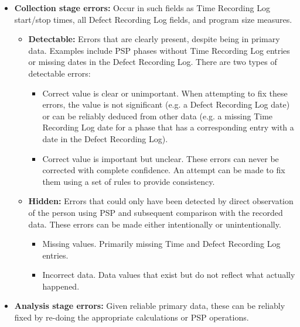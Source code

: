 \begin{itemize}
\item {\bf Collection stage errors:} Occur in such fields as Time Recording
  Log start/stop times, all Defect Recording Log fields, and program size
  measures.
   \begin{itemize}
   \item {\bf Detectable:} Errors that are clearly present, despite being
     in primary data.  Examples include PSP phases without Time Recording
     Log entries or missing dates in the Defect Recording Log.  There are
     two types of detectable errors:
      \begin{itemize}
      \item Correct value is clear or unimportant.  When attempting to fix
        these errors, the value is not significant (e.g. a Defect Recording
        Log date) or can be reliably deduced from other data (e.g. a
        missing Time Recording Log date for a phase that has a
        corresponding entry with a date in the Defect Recording Log).
      \item Correct value is important but unclear.  These errors can never be corrected
        with complete confidence.  An attempt can be made to fix them using
        a set of rules to provide consistency.
      \end{itemize}
    \item{\bf Hidden:} Errors that could only have been detected by direct
      observation of the person using PSP and subsequent comparison with
      the recorded data. These errors can be made either intentionally or
      unintentionally.
      \begin{itemize}
      \item Missing values.  Primarily missing Time and Defect Recording
        Log entries.
      \item Incorrect data. Data values that exist but do not reflect what
        actually happened.
      \end{itemize}
   \end{itemize}
 \item {\bf Analysis stage errors:} Given reliable primary data, these can
   be reliably fixed by re-doing the appropriate calculations or PSP
   operations.
\end{itemize}


